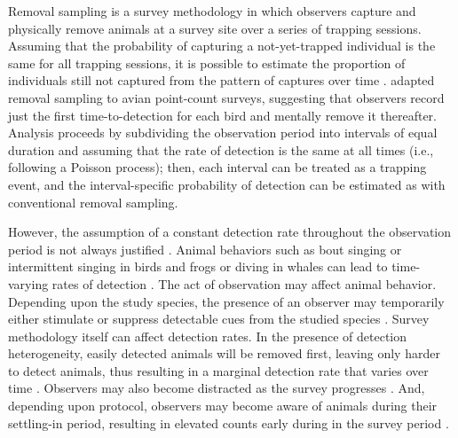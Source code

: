 \documentclass[useAMS,usenatbib,referee,12pt]{article}
\begin{document}

Removal sampling is a survey methodology in which observers capture and physically remove animals at a survey site over a series of trapping sessions.  Assuming that the probability of capturing a not-yet-trapped individual is the same for all trapping sessions, it is possible to estimate the proportion of individuals still not captured from the pattern of captures over time \citep{Moran1951, Zippin1958, Seber1982}.  \citet{Farnsworth2002} adapted removal sampling to avian point-count surveys, suggesting that observers record just the first time-to-detection for each bird and mentally remove it thereafter.  Analysis proceeds by subdividing the observation period into intervals of equal duration and assuming that the rate of detection is the same at all times (i.e., following a Poisson process); then, each interval can be treated as a trapping event, and the interval-specific probability of detection can be estimated as with conventional removal sampling.

However, the assumption of a constant detection rate throughout the observation period is not always justified \citep{Alldredge2007}.  Animal behaviors such as bout singing or intermittent singing in birds and frogs or diving in whales can lead to time-varying rates of detection \citep{Scott2005, Diefenbach2007, Reidy2011}.  The act of observation may affect animal behavior.  Depending upon the study species, the presence of an observer may temporarily either stimulate or suppress detectable cues from the studied species \citep{McSheaRappole1997, Rosenstock2002, Alldredge2007}.  Survey methodology itself can affect detection rates.  In the presence of detection heterogeneity, easily detected animals will be removed first, leaving only harder to detect animals, thus resulting in a marginal detection rate that varies over time \citep{Farnsworth2005}.  Observers may also become distracted as the survey progresses \citep{Johnson2008}.  And, depending upon protocol, observers may become aware of animals during their settling-in period, resulting in elevated counts early during in the survey period \citep{LeeMarsden2008}.
\end{document}
